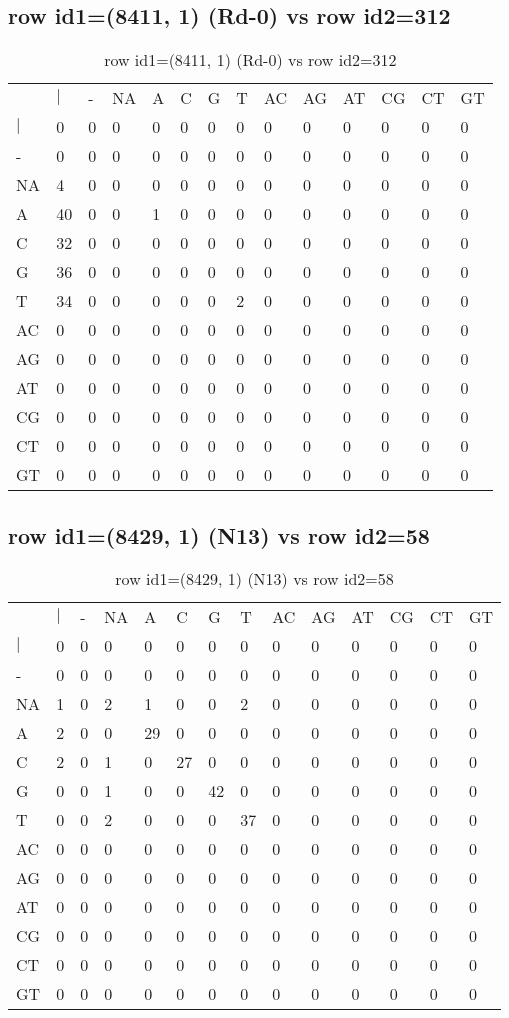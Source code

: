 \subsection{row id1=(8411, 1) (Rd-0) vs row id2=312}
\begin{center}
\begin{longtable}{|l|l|l|l|l|l|l|l|l|l|l|l|l|l|}
\caption{row id1=(8411, 1) (Rd-0) vs row id2=312} \label{table_dm482}\\
\hline
\\
\hline
&$|$&-&NA&A&C&G&T&AC&AG&AT&CG&CT&GT\\
$|$&0&0&0&0&0&0&0&0&0&0&0&0&0\\
-&0&0&0&0&0&0&0&0&0&0&0&0&0\\
NA&4&0&0&0&0&0&0&0&0&0&0&0&0\\
A&40&0&0&1&0&0&0&0&0&0&0&0&0\\
C&32&0&0&0&0&0&0&0&0&0&0&0&0\\
G&36&0&0&0&0&0&0&0&0&0&0&0&0\\
T&34&0&0&0&0&0&2&0&0&0&0&0&0\\
AC&0&0&0&0&0&0&0&0&0&0&0&0&0\\
AG&0&0&0&0&0&0&0&0&0&0&0&0&0\\
AT&0&0&0&0&0&0&0&0&0&0&0&0&0\\
CG&0&0&0&0&0&0&0&0&0&0&0&0&0\\
CT&0&0&0&0&0&0&0&0&0&0&0&0&0\\
GT&0&0&0&0&0&0&0&0&0&0&0&0&0\\
\hline
\end{longtable}
\end{center}

\subsection{row id1=(8429, 1) (N13) vs row id2=58}
\begin{center}
\begin{longtable}{|l|l|l|l|l|l|l|l|l|l|l|l|l|l|}
\caption{row id1=(8429, 1) (N13) vs row id2=58} \label{table_dm484}\\
\hline
\\
\hline
&$|$&-&NA&A&C&G&T&AC&AG&AT&CG&CT&GT\\
$|$&0&0&0&0&0&0&0&0&0&0&0&0&0\\
-&0&0&0&0&0&0&0&0&0&0&0&0&0\\
NA&1&0&2&1&0&0&2&0&0&0&0&0&0\\
A&2&0&0&29&0&0&0&0&0&0&0&0&0\\
C&2&0&1&0&27&0&0&0&0&0&0&0&0\\
G&0&0&1&0&0&42&0&0&0&0&0&0&0\\
T&0&0&2&0&0&0&37&0&0&0&0&0&0\\
AC&0&0&0&0&0&0&0&0&0&0&0&0&0\\
AG&0&0&0&0&0&0&0&0&0&0&0&0&0\\
AT&0&0&0&0&0&0&0&0&0&0&0&0&0\\
CG&0&0&0&0&0&0&0&0&0&0&0&0&0\\
CT&0&0&0&0&0&0&0&0&0&0&0&0&0\\
GT&0&0&0&0&0&0&0&0&0&0&0&0&0\\
\hline
\end{longtable}
\end{center}

